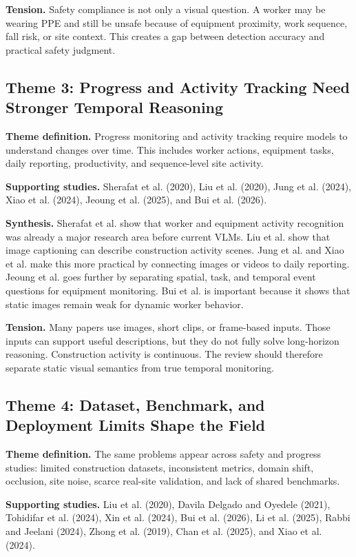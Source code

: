 \documentclass[10pt, letterpaper]{article}
\begin{document}
\textbf{Tension.} Safety compliance is not only a visual question. A worker may be wearing PPE and still be unsafe because of equipment proximity, work sequence, fall risk, or site context. This creates a gap between detection accuracy and practical safety judgment.

\subsection{Theme 3: Progress and Activity Tracking Need Stronger Temporal Reasoning}

\textbf{Theme definition.} Progress monitoring and activity tracking require models to understand changes over time. This includes worker actions, equipment tasks, daily reporting, productivity, and sequence-level site activity.

\textbf{Supporting studies.} Sherafat et al. (2020), Liu et al. (2020), Jung et al. (2024), Xiao et al. (2024), Jeoung et al. (2025), and Bui et al. (2026).

\textbf{Synthesis.} Sherafat et al. show that worker and equipment activity recognition was already a major research area before current VLMs. Liu et al. show that image captioning can describe construction activity scenes. Jung et al. and Xiao et al. make this more practical by connecting images or videos to daily reporting. Jeoung et al. goes further by separating spatial, task, and temporal event questions for equipment monitoring. Bui et al. is important because it shows that static images remain weak for dynamic worker behavior.

\textbf{Tension.} Many papers use images, short clips, or frame-based inputs. Those inputs can support useful descriptions, but they do not fully solve long-horizon reasoning. Construction activity is continuous. The review should therefore separate static visual semantics from true temporal monitoring.

\subsection{Theme 4: Dataset, Benchmark, and Deployment Limits Shape the Field}

\textbf{Theme definition.} The same problems appear across safety and progress studies: limited construction datasets, inconsistent metrics, domain shift, occlusion, site noise, scarce real-site validation, and lack of shared benchmarks.

\textbf{Supporting studies.} Liu et al. (2020), Davila Delgado and Oyedele (2021), Tohidifar et al. (2024), Xin et al. (2024), Bui et al. (2026), Li et al. (2025), Rabbi and Jeelani (2024), Zhong et al. (2019), Chan et al. (2025), and Xiao et al. (2024).
\end{document}
